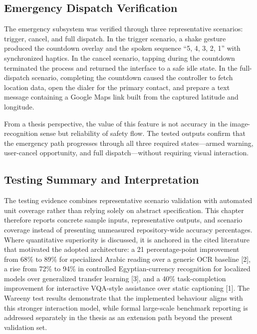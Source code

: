 \documentclass[a4paper]{report}
\begin{document}
\subsection{Emergency Dispatch Verification}
The emergency subsystem was verified through three representative scenarios: trigger, cancel, and full dispatch. In the trigger scenario, a shake gesture produced the countdown overlay and the spoken sequence ``5, 4, 3, 2, 1'' with synchronized haptics. In the cancel scenario, tapping during the countdown terminated the process and returned the interface to a safe idle state. In the full-dispatch scenario, completing the countdown caused the controller to fetch location data, open the dialer for the primary contact, and prepare a text message containing a Google Maps link built from the captured latitude and longitude.

From a thesis perspective, the value of this feature is not accuracy in the image-recognition sense but reliability of safety flow. The tested outputs confirm that the emergency path progresses through all three required states---armed warning, user-cancel opportunity, and full dispatch---without requiring visual interaction.

\subsection{Testing Summary and Interpretation}
The testing evidence combines representative scenario validation with automated unit coverage rather than relying solely on abstract specification. This chapter therefore reports concrete sample inputs, representative outputs, and scenario coverage instead of presenting unmeasured repository-wide accuracy percentages. Where quantitative superiority is discussed, it is anchored in the cited literature that motivated the adopted architecture: a 21 percentage-point improvement from 68\% to 89\% for specialized Arabic reading over a generic OCR baseline [2], a rise from 72\% to 94\% in controlled Egyptian-currency recognition for localized models over generalized transfer learning [3], and a 40\% task-completion improvement for interactive VQA-style assistance over static captioning [1]. The Wareeny test results demonstrate that the implemented behaviour aligns with this stronger interaction model, while formal large-scale benchmark reporting is addressed separately in the thesis as an extension path beyond the present validation set.
\end{document}
